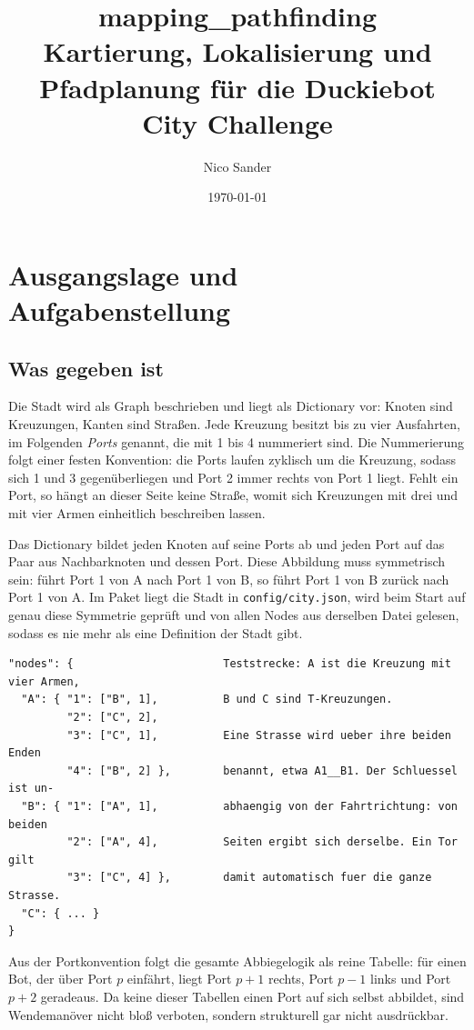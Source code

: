 \documentclass[10pt,a4paper]{article}
\title{\textbf{mapping\_pathfinding}\\[0.3em]
       \large Kartierung, Lokalisierung und Pfadplanung für die Duckiebot City Challenge}
\author{Nico Sander}
\date{\today}
\begin{document}
\maketitle

\section{Ausgangslage und Aufgabenstellung}

\subsection{Was gegeben ist}

Die Stadt wird als Graph beschrieben und liegt als Dictionary vor: Knoten sind
Kreuzungen, Kanten sind Straßen. Jede Kreuzung besitzt bis zu vier Ausfahrten,
im Folgenden \emph{Ports} genannt, die mit 1 bis 4 nummeriert sind. Die
Nummerierung folgt einer festen Konvention: die Ports laufen zyklisch um die
Kreuzung, sodass sich 1 und 3 gegenüberliegen und Port 2 immer rechts von
Port 1 liegt. Fehlt ein Port, so hängt an dieser Seite keine Straße, womit sich
Kreuzungen mit drei und mit vier Armen einheitlich beschreiben lassen.

Das Dictionary bildet jeden Knoten auf seine Ports ab und jeden Port auf das
Paar aus Nachbarknoten und dessen Port. Diese Abbildung muss symmetrisch sein:
führt Port 1 von A nach Port 1 von B, so führt Port 1 von B zurück nach Port 1
von A. Im Paket liegt die Stadt in \texttt{config/city.json}, wird beim Start
auf genau diese Symmetrie geprüft und von allen Nodes aus derselben Datei
gelesen, sodass es nie mehr als eine Definition der Stadt gibt.

\begin{lstlisting}
"nodes": {                       Teststrecke: A ist die Kreuzung mit vier Armen,
  "A": { "1": ["B", 1],          B und C sind T-Kreuzungen.
         "2": ["C", 2],
         "3": ["C", 1],          Eine Strasse wird ueber ihre beiden Enden
         "4": ["B", 2] },        benannt, etwa A1__B1. Der Schluessel ist un-
  "B": { "1": ["A", 1],          abhaengig von der Fahrtrichtung: von beiden
         "2": ["A", 4],          Seiten ergibt sich derselbe. Ein Tor gilt
         "3": ["C", 4] },        damit automatisch fuer die ganze Strasse.
  "C": { ... }
}
\end{lstlisting}

Aus der Portkonvention folgt die gesamte Abbiegelogik als reine Tabelle: für
einen Bot, der über Port $p$ einfährt, liegt Port $p+1$ rechts, Port $p-1$ links
und Port $p+2$ geradeaus. Da keine dieser Tabellen einen Port auf sich selbst
abbildet, sind Wendemanöver nicht bloß verboten, sondern strukturell gar nicht
ausdrückbar.
\end{document}
